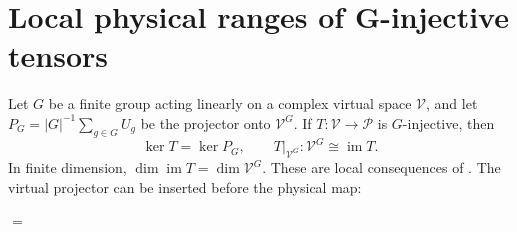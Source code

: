 \section{Local physical ranges of G-injective tensors}%
\label{sec:peps_g_injective_physical_ranges}

\begin{lemma}%
    \label{thm:peps_g_injective_invariants_range}
    \leanok
    Let $G$ be a finite group acting linearly on a complex virtual space
    $\mathcal V$, and let $P_G=|G|^{-1}\sum_{g\in G}U_g$ be the
    projector onto $\mathcal V^G$. If
    $T:\mathcal V\to\mathcal P$ is $G$-injective, then
    \[
        \ker T=\ker P_G,
        \qquad T\big|_{\mathcal V^G}:\mathcal V^G
        \mathrel{\cong}\operatorname{im}T.
    \]
    In finite dimension, $\dim\operatorname{im}T=\dim\mathcal V^G$.
    These are local consequences of
    \cite[Definition~5.1]{Schuch2010PEPS}.
    The virtual projector can be inserted before the physical map:
    \begin{tenkzequation}
        \tenkzkernel
        \begin{tenkz}[rows={wire}, cols=2, bonds=none]
        \end{tenkz}
        $=$
        \begin{tenkz}[rows={wire}, cols=1, bonds=none]
        \end{tenkz}
    \end{tenkzequation}
\end{lemma}

